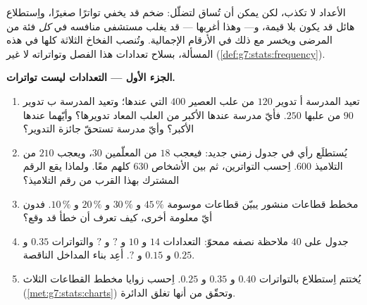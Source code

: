 \begin{problem}
\label{pb:g7:stats:1}
الأعداد لا تكذب، لكن يمكن أن تُساق لتضلّل:  ضخم
قد يخفي تواترًا صغيرًا، واِستطلاع هائل قد يكون بلا قيمة،
و--- وهذا أغربها --- قد يغلب مستشفى منافسه في
\emph{كل} فئة من المرضى ويخسر مع ذلك في الأرقام
الإجمالية. وتُنصب الفخاخ الثلاثة كلها في هذه المسألة، بسلاح
تعدادات هذا الفصل وتواتراته لا غير
(\cref{def:g7:stats:frequency}).

\medskip
\noindent\textbf{الجزء الأول --- التعدادات ليست تواترات.}
\begin{enumerate}
  \item تعيد المدرسة أ تدوير $120$ من علب العصير $400$ التي عندها؛
        وتعيد المدرسة ب تدوير $90$ من علبها $250$. فأيّ مدرسة عندها
        \emph{} الأكبر من العلب المعاد تدويرها؟ وأيّهما عندها
        \emph{} الأكبر؟ وأيّ مدرسة تستحقّ جائزة
        التدوير؟
  \item يُستطلَع رأي في جدول زمني جديد: فيعجب $18$ من المعلّمين $30$،
        ويعجب $210$ من التلاميذ $600$. اِحسب
        التواترين، ثم  بين الأشخاص $630$
        كلهم معًا. ولماذا يقع الرقم المشترك بهذا
        القرب من رقم التلاميذ؟
  \item مخطط قطاعات منشور يبيّن قطاعات موسومة $45\,\%$
        و $30\,\%$ و $20\,\%$ و $10\,\%$. فدون أيّ معلومة
        أخرى، كيف تعرف أن خطأ قد وقع؟
  \item جدول  على $40$ ملاحظة نصفه ممحوّ:
        التعدادات $14$ و $10$ و $?$ و $?$ والتواترات $0.35$
        و $0.25$ و $0.15$ و $?$. أعِد بناء المداخل الناقصة.
  \item يُختتم اِستطلاع بالتواترات $0.40$ و $0.35$ و
        $0.25$. اِحسب زوايا مخطط القطاعات الثلاث
        (\cref{met:g7:stats:charts}) وتحقّق من أنها تغلق
        الدائرة.
\end{enumerate}


\end{problem}
